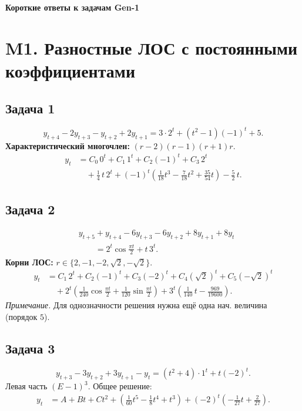 \documentclass[12pt]{article}
\begin{document}
\begin{center}
\Large\textbf{Короткие ответы к задачам Gen-1}
\end{center}

\section*{M1. Разностные ЛОС с постоянными коэффициентами}

\subsection*{Задача 1}
\[
y_{t+4}-2y_{t+3}-y_{t+2}+2y_{t+1}=3\cdot 2^{t}+(t^2-1)(-1)^t+5.
\]
\textbf{Характеристический многочлен: } $(r-2)(r-1)(r+1)r$.
\[
\begin{aligned}
y_t&=C_0\,0^t+C_1\,1^t+C_2(-1)^t+C_3\,2^t\\
&\quad+\tfrac14\,t\,2^t
+(-1)^t\!\left(\tfrac1{18}t^3-\tfrac7{18}t^2+\tfrac{35}{54}t\right)
-\tfrac52\,t.
\end{aligned}
\]

\subsection*{Задача 2}
\[
\begin{aligned}
&y_{t+5}+y_{t+4}-6y_{t+3}-6y_{t+2}+8y_{t+1}+8y_t\\
&\qquad=2^{t}\cos\frac{\pi t}{2}+t\,3^{t}.
\end{aligned}
\]
\textbf{Корни ЛОС: } $r\in\{2,-1,-2,\sqrt2,-\sqrt2\}$.
\[
\begin{aligned}
y_t&=C_1\,2^t+C_2(-1)^t+C_3(-2)^t+C_4(\sqrt2)^t+C_5(-\sqrt2)^t\\
&\quad+2^t\!\left(\tfrac1{240}\cos\frac{\pi t}{2}+\tfrac1{120}\sin\frac{\pi t}{2}\right)
+3^t\!\left(\tfrac1{140}\,t-\tfrac{969}{19600}\right).
\end{aligned}
\]
\textit{Примечание.} Для однозначности решения нужна ещё одна нач. величина (порядок $5$).

\subsection*{Задача 3}
\[
y_{t+3}-3y_{t+2}+3y_{t+1}-y_t=(t^2+4)\cdot1^t+t(-2)^t.
\]
Левая часть $(E-1)^3$. Общее решение:
\[
\begin{aligned}
y_t&=A+Bt+Ct^2
+\left(\tfrac1{60}t^5-\tfrac18 t^4+t^3\right)
+(-2)^t\!\left(-\tfrac1{27}t+\tfrac{2}{27}\right).
\end{aligned}
\]
\end{document}
